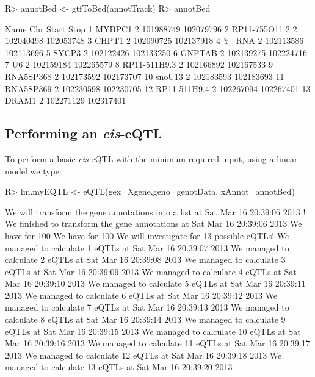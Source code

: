 \documentclass[a4paper,10pt]{article}
\begin{document}
\begin{Schunk}
\begin{Sinput}
R> annotBed <- gtfToBed(annotTrack)
R> annotBed
\end{Sinput}
\begin{Soutput}
            Name Chr     Start      Stop
1         MYBPC1   2 101988749 102079796
2  RP11-755O11.2   2 102040498 102053748
3          CHPT1   2 102090725 102137918
4          Y_RNA   2 102113586 102113696
5          SYCP3   2 102122426 102133250
6         GNPTAB   2 102139275 102224716
7             U6   2 102159184 102265579
8   RP11-511H9.3   2 102166892 102167533
9      RNA5SP368   2 102173592 102173707
10        snoU13   2 102183593 102183693
11     RNA5SP369   2 102230598 102230705
12  RP11-511H9.4   2 102267094 102267401
13         DRAM1   2 102271129 102317401
\end{Soutput}
\end{Schunk}

\subsection{Performing an \textit{cis}-eQTL }

To perform a basic \textit{cis}-eQTL with the minimum required input, using a linear model we type:

\begin{Schunk}
\begin{Sinput}
R> lm.myEQTL <- eQTL(gex=Xgene,geno=genotData, xAnnot=annotBed)
\end{Sinput}
\begin{Soutput}
We will transform the gene annotations into a list at Sat Mar 16 20:39:06 2013 !
We finished to transform the gene annotations at Sat Mar 16 20:39:06 2013 
We have for 100 % of the samples in the expression data the genotype information. 
We have for 100 % of the expression data the annotations. 
We will investigate for 13 possible eQTLs! 
We managed to calculate 1 eQTLs at Sat Mar 16 20:39:07 2013 
We managed to calculate 2 eQTLs at Sat Mar 16 20:39:08 2013 
We managed to calculate 3 eQTLs at Sat Mar 16 20:39:09 2013 
We managed to calculate 4 eQTLs at Sat Mar 16 20:39:10 2013 
We managed to calculate 5 eQTLs at Sat Mar 16 20:39:11 2013 
We managed to calculate 6 eQTLs at Sat Mar 16 20:39:12 2013 
We managed to calculate 7 eQTLs at Sat Mar 16 20:39:13 2013 
We managed to calculate 8 eQTLs at Sat Mar 16 20:39:14 2013 
We managed to calculate 9 eQTLs at Sat Mar 16 20:39:15 2013 
We managed to calculate 10 eQTLs at Sat Mar 16 20:39:16 2013 
We managed to calculate 11 eQTLs at Sat Mar 16 20:39:17 2013 
We managed to calculate 12 eQTLs at Sat Mar 16 20:39:18 2013 
We managed to calculate 13 eQTLs at Sat Mar 16 20:39:20 2013 
\end{Soutput}
\end{Schunk}
\end{document}
